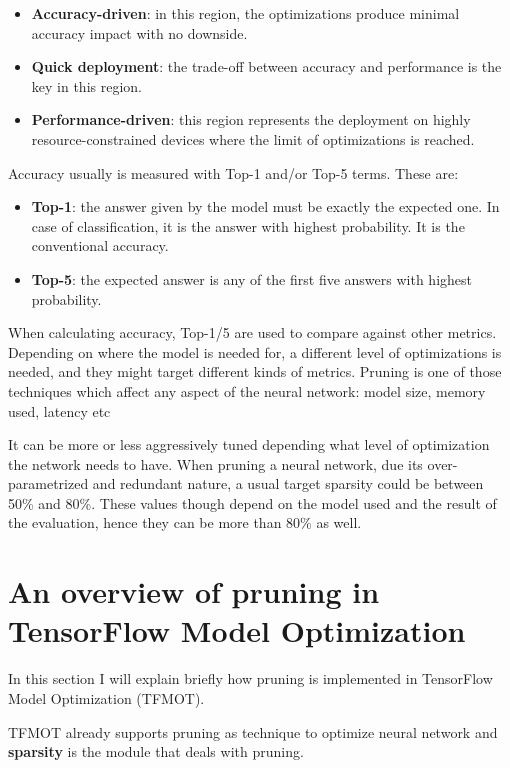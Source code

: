 \begin{itemize}
    \item \textbf{Accuracy-driven}: in this region, the optimizations produce
        minimal accuracy impact with no downside.
    \item \textbf{Quick deployment}: the trade-off between accuracy and
        performance is the key in this region.
    \item \textbf{Performance-driven}: this region represents the deployment on
        highly resource-constrained devices where the limit of optimizations is
        reached.
\end{itemize}

Accuracy usually is measured with Top-1 and/or Top-5 terms. These are:
\begin{itemize}
    \item \textbf{Top-1}: the answer given by the model must be exactly the
        expected one. In case of classification, it is the answer with highest
        probability. It is the conventional accuracy.
    \item \textbf{Top-5}: the expected answer is any of the first five answers
        with highest probability.
\end{itemize}

When calculating accuracy, Top-1/5 are used to compare against other metrics.
Depending on where the model is needed for, a different level of optimizations
is needed, and they might target different kinds of metrics.
Pruning is one of those techniques which affect any aspect of the neural
network: model size, memory used, latency etc

It can be more or less aggressively tuned depending what level of optimization
the network needs to have.
When pruning a neural network, due its over-parametrized and redundant nature,
a usual target sparsity could be between 50\% and 80\%.
These values though depend on the model used and the result of the
evaluation, hence they can be more than 80\% as well.

\section{An overview of pruning in TensorFlow Model Optimization}\label{sec:pruningtfmot}
In this section I will explain briefly how pruning is implemented in TensorFlow
Model Optimization (TFMOT).

TFMOT already supports pruning as technique to optimize neural network and
\textbf{sparsity} is the module that deals with pruning.

